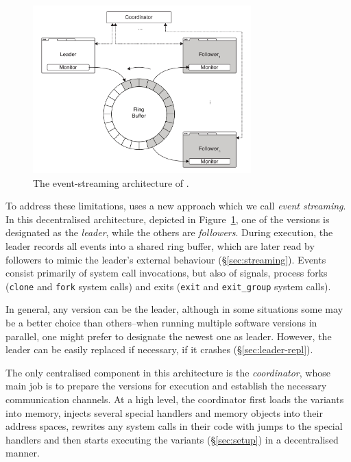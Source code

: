 \begin{figure}[t]
  \begin{center}
    \includegraphics[width=0.75\textwidth]{efficient-execution/figures/architecture}
    \caption{The event-streaming architecture of \varan.}
    \label{fig:architecture}
  \end{center}
\end{figure}

To address these limitations, \varan uses a new approach which we call
\emph{event streaming}.  In this decentralised architecture,
depicted in Figure~\ref{fig:architecture}, one of the
versions is designated as the \emph{leader}, while the others are
\emph{followers}. During execution, the leader records all events into a
shared ring buffer, which are later read by followers to mimic the leader's
external behaviour (\S\ref{sec:streaming}). Events consist primarily of system
call invocations, but also of signals, process forks (\ie \lstinline`clone`
and \lstinline`fork` system calls) and exits (\ie \lstinline`exit` and
\lstinline`exit_group` system calls).

In general, any version can be the leader, although in some situations
some may be a better choice than others--\eg when running multiple
software versions in parallel, one might prefer to designate the
newest one as leader.  However, the leader can be easily replaced if
necessary, \eg if it crashes (\S\ref{sec:leader-repl}).

The only centralised component in this architecture is the
\emph{coordinator}, whose main job is to prepare the versions for
execution and establish the necessary communication channels.  At a
high level, the coordinator first loads the variants into memory,
injects several special handlers and memory objects into their address
spaces, rewrites any system calls in their code with jumps to the
special handlers and then starts executing the variants
(\S\ref{sec:setup}) in a decentralised manner.

